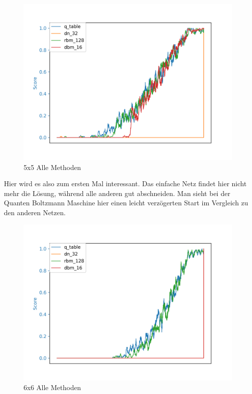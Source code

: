 \begin{figure}[H]
\centering
\includegraphics[width=\textwidth]{Figures/all_5x5_q_table_dn_32_rbm_128_dbm_16.png}
\caption{5x5 Alle Methoden}
\label{all_5}
\end{figure}

Hier wird es also zum ersten Mal interessant. Das einfache Netz findet hier nicht mehr die Lösung, während alle anderen gut abschneiden. Man sieht bei der Quanten Boltzmann Maschine hier einen leicht verzögerten Start im Vergleich zu den anderen Netzen.

\begin{figure}[H]
\centering
\includegraphics[width=\textwidth]{Figures/all_6x6_q_table_dn_32_rbm_128_dbm_16.png}
\caption{6x6 Alle Methoden}
\label{all_6}
\end{figure}

